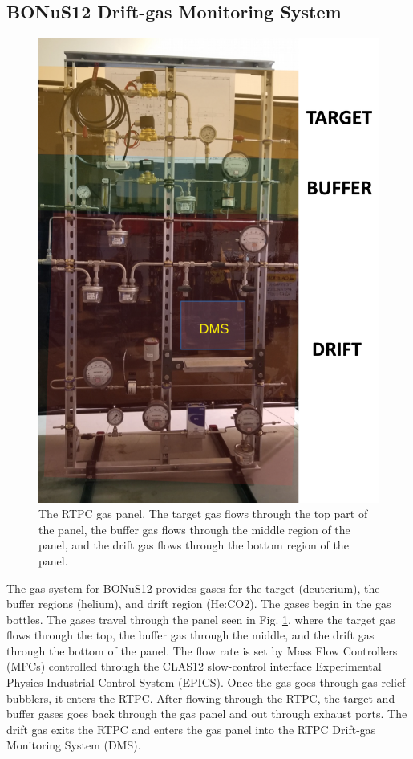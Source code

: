 \subsection{BONuS12 Drift-gas Monitoring System}
\label{sec:dms}
\begin{figure}
	\centering
	\includegraphics[width=0.9\linewidth]{figures/rtpc_gas_panel.png}
	\caption{\label{fig:rtpc_gas_panel}The RTPC gas panel. The target gas flows through the top part of the panel, the buffer gas flows through the middle region of the panel, and the drift gas flows through the bottom region of the panel.}
\end{figure}
The gas system for BONuS12 provides gases for the target (deuterium), the buffer regions (helium), and drift region (He:CO2). The gases begin in the gas bottles. The gases travel through the panel seen in Fig. \ref{fig:rtpc_gas_panel}, where the target gas flows through the top, the buffer gas through the middle, and the drift gas through the bottom of the panel. The flow rate is set by Mass Flow Controllers (MFCs) controlled through the CLAS12 slow-control interface Experimental Physics Industrial Control System (EPICS). Once the gas goes through gas-relief bubblers, it enters the RTPC. After flowing through the RTPC, the target and buffer gases goes back through the gas panel and out through exhaust ports. The drift gas exits the RTPC and enters the gas panel into the RTPC Drift-gas Monitoring System (DMS).

